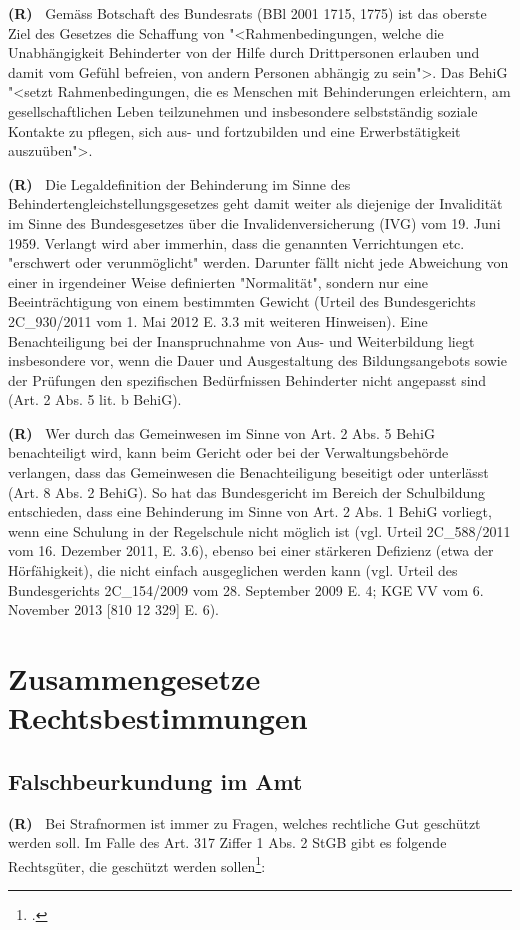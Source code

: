 \documentclass[paper=a4,fontsize=12pt, oneside, numbers=noenddot]{scrbook}
\newcounter{rz}
\newcommand{\Rz}{
	\addtocounter{rz}{1}\textbf{(R\arabic{rz})~}
}
\begin{document}
\Rz Gemäss Botschaft des Bundesrats (BBl 2001 1715, 1775) ist das oberste Ziel des Gesetzes die Schaffung von "<Rahmenbedingungen, welche die Unabhängigkeit Behinderter von der Hilfe durch Drittpersonen erlauben und damit vom Gefühl befreien, von andern Personen abhängig zu sein">. Das BehiG "<setzt Rahmenbedingungen, die es Menschen mit Behinderungen erleichtern, am gesellschaftlichen Leben teilzunehmen und insbesondere selbstständig soziale Kontakte zu pflegen, sich aus- und fortzubilden und eine Erwerbstätigkeit auszuüben">.

\Rz Die Legaldefinition der Behinderung im Sinne des Behindertengleichstellungsgesetzes geht damit weiter als diejenige der Invalidität im Sinne des Bundesgesetzes über die Invalidenversicherung (IVG) vom 19. Juni 1959. Verlangt wird aber immerhin, dass die genannten Verrichtungen etc. "erschwert oder verunmöglicht" werden. Darunter fällt nicht jede Abweichung von einer in irgendeiner Weise definierten "Normalität", sondern nur eine Beeinträchtigung von einem bestimmten Gewicht (Urteil des Bundesgerichts 2C\_930/2011 vom 1. Mai 2012 E. 3.3 mit weiteren Hinweisen). Eine Benachteiligung bei der Inanspruchnahme von Aus- und Weiterbildung liegt insbesondere vor, wenn die Dauer und Ausgestaltung des Bildungsangebots sowie der Prüfungen den spezifischen Bedürfnissen Behinderter nicht angepasst sind (Art. 2 Abs. 5 lit. b BehiG). 

\Rz Wer durch das Gemeinwesen im Sinne von Art. 2 Abs. 5 BehiG benachteiligt wird, kann beim Gericht oder bei der Verwaltungsbehörde verlangen, dass das Gemeinwesen die Benachteiligung beseitigt oder unterlässt (Art. 8 Abs. 2 BehiG). So hat das Bundesgericht im Bereich der Schulbildung entschieden, dass eine Behinderung im Sinne von Art. 2 Abs. 1 BehiG vorliegt, wenn eine Schulung in der Regelschule nicht möglich ist (vgl. Urteil 2C\_588/2011 vom 16. Dezember 2011, E. 3.6), ebenso bei einer stärkeren Defizienz (etwa der Hörfähigkeit), die nicht einfach ausgeglichen werden kann (vgl. Urteil des Bundesgerichts 2C\_154/2009 vom 28. September 2009 E. 4; KGE VV vom 6. November 2013 [810 12 329] E. 6).



\section{Zusammengesetze Rechtsbestimmungen}

\subsection{Falschbeurkundung im Amt}
\Rz Bei Strafnormen ist immer zu Fragen, welches rechtliche Gut geschützt werden soll. Im Falle des Art. 317 Ziffer 1 Abs. 2 StGB gibt es folgende Rechtsgüter, die geschützt werden sollen\footcite[Art. 317, Rz. 1]{2020:Wohlers:StGBHandkommentar}:
\end{document}
